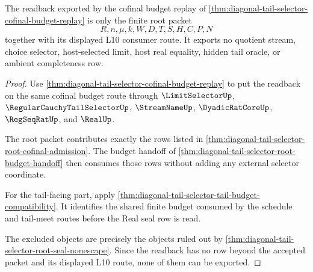 \begin{theorem}
\label{thm:diagonal-tail-selector-budget-readback-nonescape}
The readback exported by the cofinal budget replay of
\autoref{thm:diagonal-tail-selector-cofinal-budget-replay} is only the finite
root packet
$$
R,n,\mu,k,W,D,T,S,H,C,P,N
$$
together with its displayed L10 consumer route. It exports no quotient stream,
choice selector, host-selected limit, host real equality, hidden tail oracle,
or ambient completeness row.
\end{theorem}
\begin{proof}
Use \autoref{thm:diagonal-tail-selector-cofinal-budget-replay} to put the
readback on the same cofinal budget route through $\LimitSelectorUp$,
$\RegularCauchyTailSelectorUp$, $\StreamNameUp$, $\DyadicRatCoreUp$,
$\RegSeqRatUp$, and $\RealUp$.

The root packet contributes exactly the rows listed in
\autoref{thm:diagonal-tail-selector-root-cofinal-admission}. The budget
handoff of \autoref{thm:diagonal-tail-selector-root-budget-handoff} then
consumes those rows without adding any external selector coordinate.

For the tail-facing part, apply
\autoref{thm:diagonal-tail-selector-tail-budget-compatibility}. It identifies
the shared finite budget consumed by the schedule and tail-meet routes before
the Real seal row is read.

The excluded objects are precisely the objects ruled out by
\autoref{thm:diagonal-tail-selector-root-seal-nonescape}. Since the readback
has no row beyond the accepted packet and its displayed L10 route, none of
them can be exported.
\end{proof}

